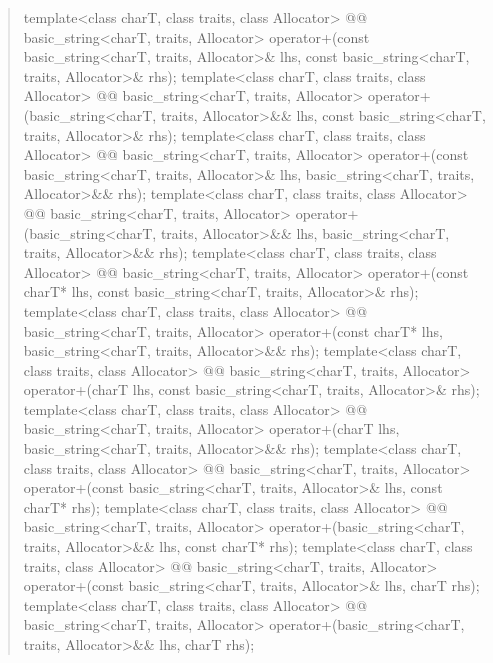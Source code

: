 \documentclass{wg21}
\begin{document}
\begin{quote}
\begin{codeblock}
{  template<class charT, class traits, class Allocator>
    @@ basic_string<charT, traits, Allocator>
      operator+(const basic_string<charT, traits, Allocator>& lhs,
                const basic_string<charT, traits, Allocator>& rhs);
  template<class charT, class traits, class Allocator>
    @@ basic_string<charT, traits, Allocator>
      operator+(basic_string<charT, traits, Allocator>&& lhs,
                const basic_string<charT, traits, Allocator>& rhs);
  template<class charT, class traits, class Allocator>
    @@ basic_string<charT, traits, Allocator>
      operator+(const basic_string<charT, traits, Allocator>& lhs,
                basic_string<charT, traits, Allocator>&& rhs);
  template<class charT, class traits, class Allocator>
    @@ basic_string<charT, traits, Allocator>
      operator+(basic_string<charT, traits, Allocator>&& lhs,
                basic_string<charT, traits, Allocator>&& rhs);
  template<class charT, class traits, class Allocator>
    @@ basic_string<charT, traits, Allocator>
      operator+(const charT* lhs,
                const basic_string<charT, traits, Allocator>& rhs);
  template<class charT, class traits, class Allocator>
    @@ basic_string<charT, traits, Allocator>
      operator+(const charT* lhs,
                basic_string<charT, traits, Allocator>&& rhs);
  template<class charT, class traits, class Allocator>
    @@ basic_string<charT, traits, Allocator>
      operator+(charT lhs,
                const basic_string<charT, traits, Allocator>& rhs);
  template<class charT, class traits, class Allocator>
    @@ basic_string<charT, traits, Allocator>
      operator+(charT lhs,
                basic_string<charT, traits, Allocator>&& rhs);
  template<class charT, class traits, class Allocator>
    @@ basic_string<charT, traits, Allocator>
      operator+(const basic_string<charT, traits, Allocator>& lhs,
                const charT* rhs);
  template<class charT, class traits, class Allocator>
    @@ basic_string<charT, traits, Allocator>
      operator+(basic_string<charT, traits, Allocator>&& lhs,
                const charT* rhs);
  template<class charT, class traits, class Allocator>
    @@ basic_string<charT, traits, Allocator>
      operator+(const basic_string<charT, traits, Allocator>& lhs,
                charT rhs);
  template<class charT, class traits, class Allocator>
    @@ basic_string<charT, traits, Allocator>
      operator+(basic_string<charT, traits, Allocator>&& lhs,
                charT rhs);

}
\end{codeblock}
\end{quote}
\end{document}

